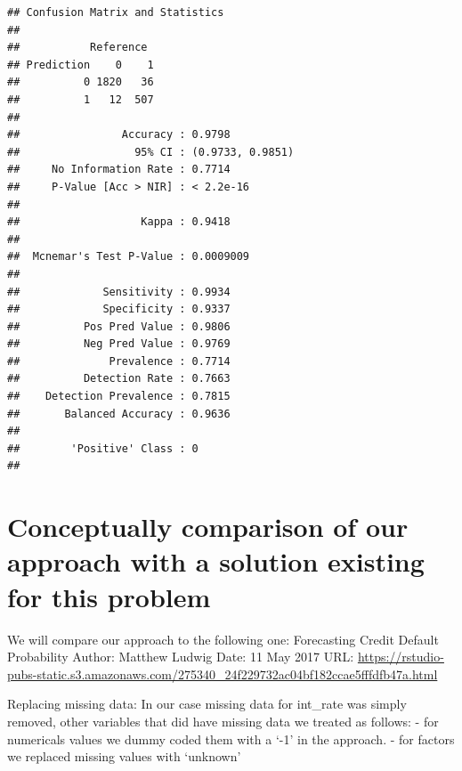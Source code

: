 \documentclass[]{article}
\newenvironment{Shaded}{\begin{snugshade}}{\end{snugshade}}
\newcommand{\CommentTok}[1]{\textcolor[rgb]{0.56,0.35,0.01}{\textit{#1}}}
\newcommand{\KeywordTok}[1]{\textcolor[rgb]{0.13,0.29,0.53}{\textbf{#1}}}
\newcommand{\NormalTok}[1]{#1}
\newcommand{\OperatorTok}[1]{\textcolor[rgb]{0.81,0.36,0.00}{\textbf{#1}}}
\begin{document}
\begin{Shaded}
\end{Shaded}

\begin{verbatim}
## Confusion Matrix and Statistics
## 
##           Reference
## Prediction    0    1
##          0 1820   36
##          1   12  507
##                                           
##                Accuracy : 0.9798          
##                  95% CI : (0.9733, 0.9851)
##     No Information Rate : 0.7714          
##     P-Value [Acc > NIR] : < 2.2e-16       
##                                           
##                   Kappa : 0.9418          
##                                           
##  Mcnemar's Test P-Value : 0.0009009       
##                                           
##             Sensitivity : 0.9934          
##             Specificity : 0.9337          
##          Pos Pred Value : 0.9806          
##          Neg Pred Value : 0.9769          
##              Prevalence : 0.7714          
##          Detection Rate : 0.7663          
##    Detection Prevalence : 0.7815          
##       Balanced Accuracy : 0.9636          
##                                           
##        'Positive' Class : 0               
## 
\end{verbatim}

\pagebreak

\hypertarget{conceptually-comparison-of-our-approach-with-a-solution-existing-for-this-problem}{%
\section{Conceptually comparison of our approach with a solution
existing for this
problem}\label{conceptually-comparison-of-our-approach-with-a-solution-existing-for-this-problem}}

We will compare our approach to the following one: Forecasting Credit
Default Probability Author: Matthew Ludwig Date: 11 May 2017 URL:
\url{https://rstudio-pubs-static.s3.amazonaws.com/275340_24f229732ac04bf182ccae5fffdfb47a.html}

Replacing missing data: In our case missing data for int\_rate was
simply removed, other variables that did have missing data we treated as
follows: - for numericals values we dummy coded them with a `-1' in the
approach. - for factors we replaced missing values with `unknown'
\end{document}
